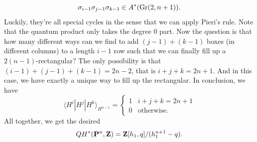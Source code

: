 \documentclass[../main.tex]{subfiles}
\begin{document}
$$\sigma_{i-1}\sigma_{j-1}\sigma_{k-1}\in A^{*}(\operatorname{Gr}(2, n+1)).$$
Luckily, they're all special cycles in the sense that we can apply Pieri's rule. Note that the quantum product only takes the degree $0$ part. Now the question is that how many different ways can we find to add $(j-1)+(k-1)$ boxes (in different columns) to a length $i-1$ row such that we can finally fill up a $2(n-1)$-rectangular? The only possibility is that $(i-1)+(j-1)+(k-1)=2n-2$, that is $i+j+k=2n+1$. And in this case, we have exactly a unique way to fill up the rectangular. In conclusion, we have 
$$\langle H^{i}|H^{j}|H^{k}\rangle_{H^{n-1}}=\begin{cases}1 & i+j+k=2n+1\\
0 & \text{otherwise}.\end{cases}$$
All together, we get the desired 
$$QH^{*}(\mathbf{P}^{n}, \mathbf{Z})=\mathbf{Z}[h_{1},q]/(h_{1}^{n+1}-q).$$
\end{document}
